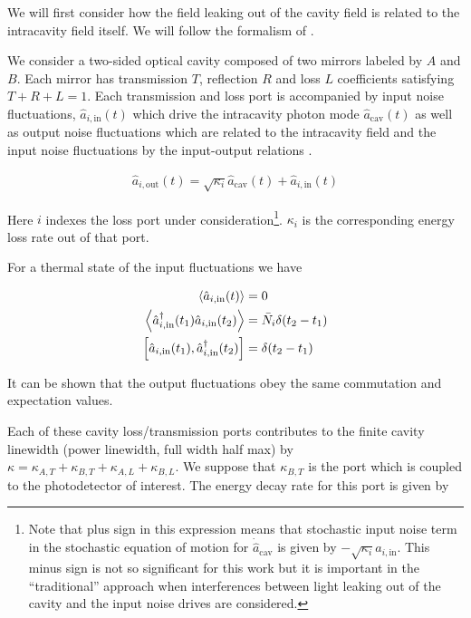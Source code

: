 \documentclass[12pt]{article}
\begin{document}
We will first consider how the field leaking out of the cavity field is related to the intracavity field itself. We will follow the formalism of \cite{Gardiner1985}. 

We consider a two-sided optical cavity composed of two mirrors labeled by $A$ and $B$. Each mirror has transmission $T$, reflection $R$ and loss $L$ coefficients satisfying $T+R+L = 1$. Each transmission and loss port is accompanied by input noise fluctuations, $\hat{a}_{i,\text{in}}(t)$ which drive the intracavity photon mode $\hat{a}_{\text{cav}}(t)$ as well as output noise fluctuations which are related to the intracavity field and the input noise fluctuations by the input-output relations \cite{Gardiner1985}.

\begin{align}
\hat{a}_{i,\text{out}}(t) = \sqrt{\kappa_i} \hat{a}_{\text{cav}}(t) + \hat{a}_{i,\text{in}}(t)
\end{align}

Here $i$ indexes the loss port under consideration\footnote{Note that plus sign in this expression means that stochastic input noise term in the stochastic equation of motion for $\dot{\hat{a}}_{\text{cav}}$ is given by $-\sqrt{\kappa_i}a_{i,\text{in}}$. This minus sign is not so significant for this work but it is important in the ``traditional'' approach when interferences between light leaking out of the cavity and the input noise drives are considered.}. $\kappa_i$ is the corresponding energy loss rate out of that port.

For a thermal state of the input fluctuations we have

\begin{align}
\Braket{\hat{a}_{i,\text{in}}(t)} &= 0\\
\Braket{\hat{a}_{i,\text{in}}^{\dag}(t_1)\hat{a}_{i,\text{in}}(t_2)} &= \bar{N}_i\delta(t_2-t_1)\\
\left[\hat{a}_{i,\text{in}}(t_1),\hat{a}^{\dag}_{i,\text{in}}(t_2)\right] &= \delta(t_2-t_1)
\end{align}

It can be shown \cite{Gardiner1985} that the output fluctuations obey the same commutation and expectation values.

Each of these cavity loss/transmission ports contributes to the finite cavity linewidth (power linewidth, full width half max) by $\kappa = \kappa_{A, T} + \kappa_{B, T} + \kappa_{A, L} + \kappa_{B, L}$. We suppose that $\kappa_{B,T}$ is the port which is coupled to the photodetector of interest. The energy decay rate for this port is given by
\end{document}
